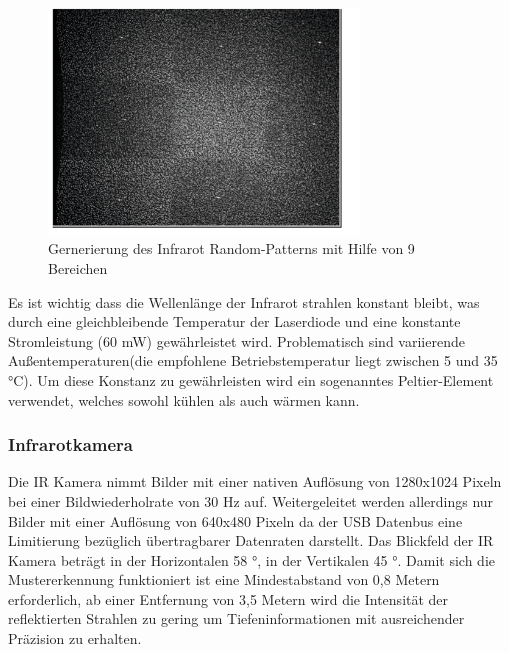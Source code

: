 \begin{figure}
  \vspace{-20pt}
  \begin{center}
        \includegraphics[height=6cm]{Res/9_Dots.png}
  \end{center}
  \vspace{-20pt}
  \caption{Gernerierung des Infrarot Random-Patterns mit Hilfe von 9 Bereichen }
  \vspace{-10pt}
\end{figure}





Es ist wichtig dass die Wellenlänge der Infrarot strahlen konstant bleibt, was durch eine gleichbleibende Temperatur der Laserdiode und eine konstante Stromleistung (60 mW) gewährleistet wird. Problematisch sind variierende Außentemperaturen(die empfohlene Betriebstemperatur  liegt zwischen 5 und 35 °C). Um diese Konstanz zu gewährleisten wird ein sogenanntes  Peltier-Element verwendet, welches sowohl kühlen als auch wärmen kann.\\

\subsubsection{Infrarotkamera}


Die IR Kamera nimmt Bilder mit einer nativen Auflösung von 1280x1024 Pixeln bei einer Bildwiederholrate von 30 Hz auf. Weitergeleitet werden allerdings nur Bilder mit einer Auflösung von 640x480 Pixeln da der USB Datenbus eine Limitierung bezüglich übertragbarer Datenraten darstellt. Das Blickfeld der IR Kamera beträgt in der Horizontalen 58 °, in der Vertikalen 45 °. Damit sich die Mustererkennung funktioniert ist eine Mindestabstand von 0,8 Metern erforderlich, ab einer Entfernung von 3,5 Metern wird die Intensität der reflektierten Strahlen zu gering um Tiefeninformationen mit ausreichender Präzision zu erhalten.\\



